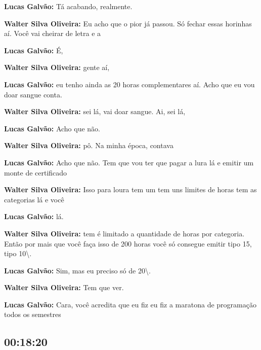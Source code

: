 \textbf{Lucas Galvão:} Tá acabando, realmente.



\textbf{Walter Silva Oliveira:} Eu acho que o pior já passou. Só fechar essas horinhas aí. Você vai cheirar de letra e a



\textbf{Lucas Galvão:} É,



\textbf{Walter Silva Oliveira:} gente aí,



\textbf{Lucas Galvão:} eu tenho ainda as 20 horas complementares aí. Acho que eu vou doar sangue conta.



\textbf{Walter Silva Oliveira:} sei lá, vai doar sangue. Ai, sei lá,



\textbf{Lucas Galvão:} Acho que não.



\textbf{Walter Silva Oliveira:} pô. Na minha época, contava



\textbf{Lucas Galvão:} Acho que não. Tem que vou ter que pagar a lura lá e emitir um monte de certificado



\textbf{Walter Silva Oliveira:} Isso para loura tem um tem uns limites de horas tem as categorias lá e você



\textbf{Lucas Galvão:} lá.



\textbf{Walter Silva Oliveira:} tem é limitado a quantidade de horas por categoria. Então por mais que você faça isso de 200 horas você só consegue emitir tipo 15, tipo 10\textbackslash{}.



\textbf{Lucas Galvão:} Sim, mas eu preciso só de 20\textbackslash{}.



\textbf{Walter Silva Oliveira:} Tem que ver.



\textbf{Lucas Galvão:} Cara, você acredita que eu fiz eu fiz a maratona de programação todos os semestres



\subsection{\textbf{00:18:20}}



